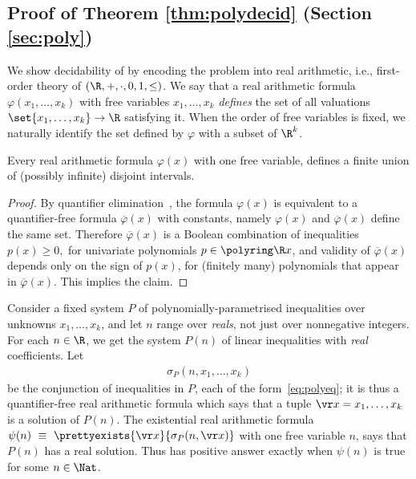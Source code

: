 \subsection{Proof of Theorem  \ref{thm:polydecid} (Section \ref{sec:poly})}
\label{sec:poly-proofs}

We show decidability of \polyineqsolvname %
by 
encoding the problem into real arithmetic, i.e., first-order theory of $(\R, +, \cdot, 0, 1, \leq)$.
%
We say that a real arithmetic formula $\varphi(x_1, \ldots, x_k)$ with free variables $x_1, \ldots, x_k$
\emph{defines} the set of all valuations $\set{x_1, \ldots, x_k}\to\R$ satisfying it. 
%
When the order of free variables is fixed, we naturally identify the set defined by $\varphi$ with a subset of $\R^k$.
%
\begin{claim} \label{claim:1var}
Every real arithmetic formula $\varphi(x)$ with one free variable, 
defines
a finite union of (possibly infinite) disjoint intervals.
\end{claim}
\begin{proof}
By quantifier elimination~\cite{Tar51}, the formula $\varphi(x)$ is equivalent to a 
quantifier-free formula $\overline\varphi(x)$ with constants, namely $\varphi(x)$ and $\overline\varphi(x)$ define the same set.
Therefore $\overline\varphi(x)$ is a Boolean combination of inequalities
$
p(x) \geq 0,
$
for univariate polynomials $p\in\polyring \R x$, and validity of $\overline\varphi(x)$
depends only on the sign of $p(x)$, for (finitely many) polynomials that appear in $\overline\varphi(x)$.
This implies the claim.
\end{proof}

Consider a fixed system $P$ of polynomially-parametrised inequalities over unknowns $x_1, \ldots, x_k$, and
let $n$ range over \emph{reals}, not just over nonnegative integers.
For each $n\in\R$, we  get the system $P(n)$ of linear inequalities with \emph{real} coefficients.  
Let 
%
\begin{align} \label{eq:sigmaP}
\sigma_P(n, x_1,\ldots, x_k)
\end{align}
%
 be the conjunction of inequalities in $P$, each of the form~\eqref{eq:polyeq};
it is thus a quantifier-free real arithmetic formula which says
that a  tuple $\vr x = x_1, \ldots, x_k$ is a solution of  $P(n)$. 
The existential real arithmetic formula $\psi(n) \ \equiv \ \prettyexists{\vr x}{\sigma_P(n, \vr x) }$ 
with one free variable $n$,
says that $P(n)$ has a real solution.
%
Thus 
\polyineqsolvname has positive answer exactly when $\psi(n)$ is true for some $n\in\Nat$.

